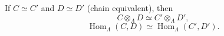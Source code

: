 If $C \simeq C'$ and $D \simeq D'$ (chain equivalent), then
$$C \otimes_\Lambda D \simeq C' \otimes_\Lambda D',$$
$$\operatorname{Hom}_\Lambda(C, D) \simeq \operatorname{Hom}_\Lambda(C', D').$$
